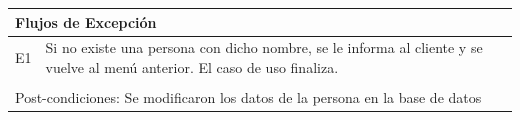 \documentclass[11pt]{article}
\begin{document}
\begin{tabular}{|l|m{}|}
    \multicolumn{2}{|l|}{Flujos de Excepción} \\
    \hline
  
    E1 & Si no existe una persona con dicho nombre, se le informa al cliente y se vuelve al men\'u anterior. 
    El caso de uso finaliza.\\
  
    \hline
    \multicolumn{2}{|l|}{\rowcolor[gray]{.5}} \\
    \hline
  
    \multicolumn{2}{|m{0.9\textwidth}|}{Post-condiciones: Se modificaron los datos de la persona en la base de datos} \\
  
    \hline
  \end{tabular}
  \newline
\end{document}
